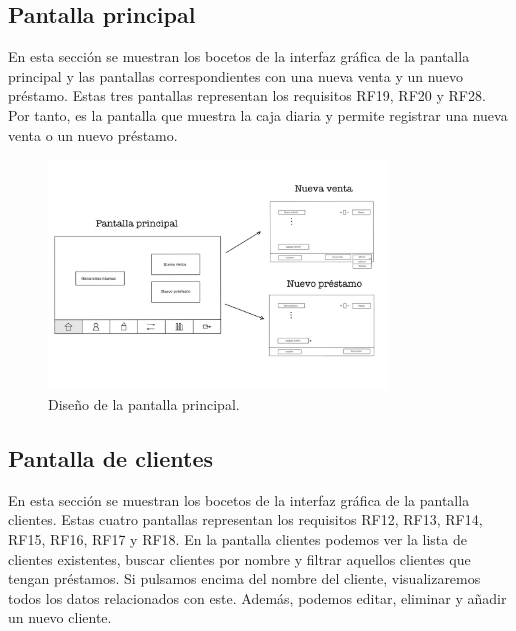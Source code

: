 \subsection{Pantalla principal}

En esta sección se muestran los bocetos de la interfaz gráfica de la pantalla principal y las pantallas correspondientes con una nueva venta y un nuevo préstamo. Estas tres pantallas representan los requisitos RF19, RF20 y RF28. Por tanto, es la pantalla que muestra la caja diaria y permite registrar una nueva venta o un nuevo préstamo. 

\begin{figure}[ht]
	\centering
	\includegraphics[width=0.8\textwidth, angle=270]{imagenes/pantalla_principal.JPG}
	\caption{Diseño de la pantalla principal.}
	\label{fig:pantallaprincipal}
\end{figure}

\newpage

\subsection{Pantalla de clientes}

En esta sección se muestran los bocetos de la interfaz gráfica de la pantalla clientes. Estas cuatro pantallas representan los requisitos RF12, RF13, RF14, RF15, RF16, RF17 y RF18. En la pantalla clientes podemos ver la lista de clientes existentes, buscar clientes por nombre y filtrar aquellos clientes que tengan préstamos. Si pulsamos encima del nombre del cliente, visualizaremos todos los datos relacionados con este. Además, podemos editar, eliminar y añadir un nuevo cliente. 


